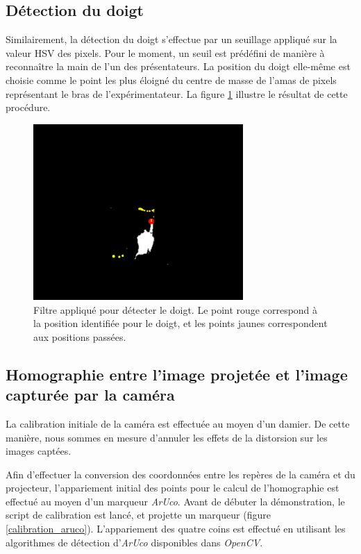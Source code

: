 \documentclass[11pt]{report}
\begin{document}
\subsection{Détection du doigt}
Similairement, la détection du doigt s'effectue par un seuillage appliqué sur la
valeur HSV des pixels. Pour le moment, un seuil est prédéfini de manière à
reconnaître la main de l'un des présentateurs. La position du doigt elle-même
est choisie comme le point les plus éloigné du centre de masse de l'amas de
pixels représentant le bras de l'expérimentateur. La figure
\ref{detection_doigt} illustre le résultat de cette procédure.

\begin{figure}[h]
  \centering
  \includegraphics[width=8cm]{detection-doigt.png}
  \caption{Filtre appliqué pour détecter le doigt. Le point rouge correspond à
    la position identifiée pour le doigt, et les points jaunes correspondent aux
    positions passées.}
  \label{detection_doigt}
\end{figure}


\subsection{Homographie entre l'image projetée et l'image capturée par la
  caméra}
La calibration initiale de la caméra est effectuée au moyen d'un damier. De
cette manière, nous sommes en mesure d'annuler les effets de la distorsion sur
les images captées.

Afin d'effectuer la conversion des coordonnées entre les repères de la caméra et
du projecteur, l'appariement initial des points pour le calcul de l'homographie
est effectué au moyen d'un marqueur \textit{ArUco}. Avant de débuter la
démonstration, le script de calibration est lancé, et projette un marqueur
(figure \ref{calibration_aruco}).
L'appariement des quatre coins est effectué en utilisant les algorithmes de
détection d'\textit{ArUco} disponibles dans \textit{OpenCV}. 
\end{document}
